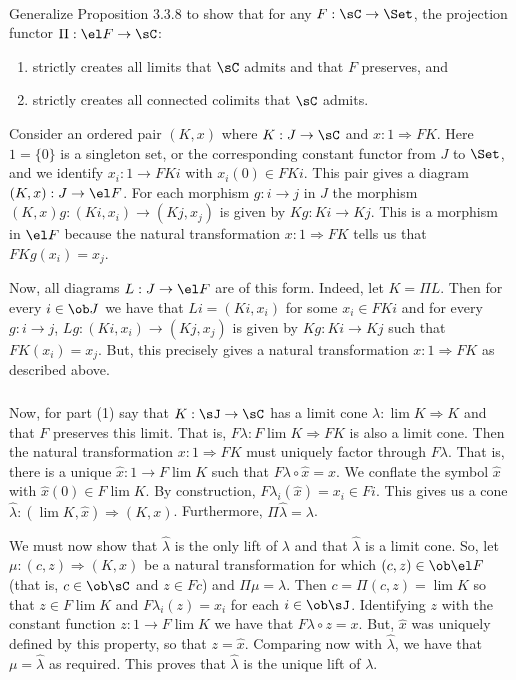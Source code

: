 \documentclass[main.tex]{subfiles}
\begin{document}
\paragraph{}
\begin{exercise}
	Generalize Proposition 3.3.8 to show that for any $F:\sC\rightarrow\Set$, the projection functor $\Pi:\el F\rightarrow\sC$:
	\begin{enumerate}
		\item strictly creates all limits that $\sC$ admits and that $F$ preserves, and
		\item strictly creates all connected colimits that $\sC$ admits.
	\end{enumerate}
\end{exercise}

Consider an ordered pair $(K,x)$ where $K:J\rightarrow\sC$ and $x:1\Rightarrow
FK$. Here $1=\{0\}$ is a singleton set, or the corresponding constant functor
from $J$ to $\Set$, and we identify $x_i:1\rightarrow FKi$ with $x_i(0)\in FKi$.
This pair gives a diagram $(K,x):J\rightarrow\el F$. For each morphism
$g:i\rightarrow j$ in $J$ the morphism $(K,x)g:(Ki,x_i)\rightarrow(Kj,x_j)$ is
given by $Kg:Ki\rightarrow Kj$. This is a morphism in $\el F$ because the
natural transformation $x:1\Rightarrow FK$ tells us that $FKg(x_i)=x_j$.

Now, all diagrams $L:J\rightarrow\el F$ are of this form. Indeed, let $K=\Pi L$.
Then for every $i\in\ob J$ we have that $Li=(Ki,x_i)$ for some $x_i\in FKi$ and
for every $g:i\rightarrow j$, $Lg:(Ki,x_i)\rightarrow(Kj,x_j)$ is given by
$Kg:Ki\rightarrow Kj$ such that $FK(x_i)=x_j$. But, this precisely gives a
natural transformation $x:1\Rightarrow FK$ as described above.

\subparagraph{}
Now, for part (1) say that $K:\sJ\rightarrow\sC$ has a limit cone $\lambda:\lim
K\Rightarrow K$ and that $F$ preserves this limit. That is, $F\lambda:F\lim
K\Rightarrow FK$ is also a limit cone. Then the natural transformation
$x:1\Rightarrow FK$ must uniquely factor through $F\lambda$. That is, there is a
unique $\hat{x}:1\rightarrow F\lim K$ such that $F\lambda\circ\hat{x}=x$. We
conflate the symbol $\hat{x}$ with $\hat{x}(0)\in F\lim K$. By construction,
$F\lambda_i(\hat{x})=x_i\in Fi$. This gives us a cone $\hat{\lambda}:(\lim
K,\hat{x})\Rightarrow(K,x)$. Furthermore, $\Pi\hat{\lambda}=\lambda$.

We must now show that $\hat{\lambda}$ is the only lift of $\lambda$ and that
$\hat{\lambda}$ is a limit cone. So, let $\mu:(c,z)\Rightarrow(K,x)$ be a
natural transformation for which $(c,z)\in\ob\el F$ (that is, $c\in\ob\sC$ and
$z\in Fc$) and $\Pi\mu=\lambda$. Then $c=\Pi(c,z)=\lim K$ so that $z\in F\lim K$
and $F\lambda_i(z)=x_i$ for each $i\in\ob\sJ$. Identifying $z$ with the constant
function $z:1\rightarrow F\lim K$ we have that $F\lambda\circ z=x$. But,
$\hat{x}$ was uniquely defined by this property, so that $z=\hat{x}$. Comparing
now with $\hat{\lambda}$, we have that $\mu=\hat{\lambda}$ as required. This
proves that $\hat{\lambda}$ is the unique lift of $\lambda$.
\end{document}

